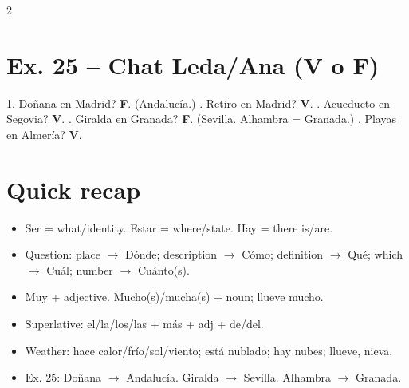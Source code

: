 \documentclass[9pt,a4paper]{article}
\newcommand{\tip}[1]{\textcolor{spanishgreen}{\textbf{#1}}}
\begin{document}
\begin{multicols}{2}
\section*{\color{spanishgreen}Ex. 25 -- Chat Leda/Ana (V o F)}
1. Do\~nana en Madrid? \textbf{F}. (Andaluc\'ia.) . Retiro en Madrid? \textbf{V}. . Acueducto en Segovia? \textbf{V}. . Giralda en Granada? \textbf{F}. (Sevilla. Alhambra = Granada.) . Playas en Almer\'ia? \textbf{V}.

\section*{\tip{Quick recap}}
\begin{itemize}
\item Ser = what/identity. Estar = where/state. Hay = there is/are.
\item Question: place $\to$ D\'onde; description $\to$ C\'omo; definition $\to$ Qu\'e; which $\to$ Cu\'al; number $\to$ Cu\'anto(s).
\item Muy + adjective. Mucho(s)/mucha(s) + noun; llueve mucho.
\item Superlative: el/la/los/las + m\'as + adj + de/del.
\item Weather: hace calor/fr\'io/sol/viento; est\'a nublado; hay nubes; llueve, nieva.
\item Ex. 25: Do\~nana $\to$ Andaluc\'ia. Giralda $\to$ Sevilla. Alhambra $\to$ Granada.
\end{itemize}

\end{multicols}
\end{document}
